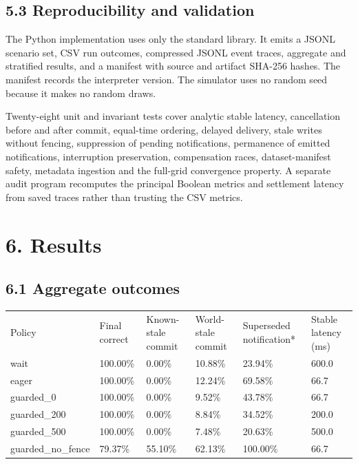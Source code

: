 \documentclass[10pt]{article}
\begin{document}
\subsection*{5.3 Reproducibility and validation}

The Python implementation uses only the standard library. It emits a JSONL scenario set, CSV run outcomes, compressed JSONL event traces, aggregate and stratified results, and a manifest with source and artifact SHA-256 hashes. The manifest records the interpreter version. The simulator uses no random seed because it makes no random draws.


Twenty-eight unit and invariant tests cover analytic stable latency, cancellation before and after commit, equal-time ordering, delayed delivery, stale writes without fencing, suppression of pending notifications, permanence of emitted notifications, interruption preservation, compensation races, dataset-manifest safety, metadata ingestion and the full-grid convergence property. A separate audit program recomputes the principal Boolean metrics and settlement latency from saved traces rather than trusting the CSV metrics.


\section*{6. Results}

\subsection*{6.1 Aggregate outcomes}

{\scriptsize
\begin{tabularx}{\textwidth}{XXXXXX}
\hline
Policy & Final correct & Known-stale commit & World-stale commit & Superseded notification* & Stable latency (ms) \\
wait & 100.00\% & 0.00\% & 10.88\% & 23.94\% & 600.0 \\
eager & 100.00\% & 0.00\% & 12.24\% & 69.58\% & 66.7 \\
guarded\_0 & 100.00\% & 0.00\% & 9.52\% & 43.78\% & 66.7 \\
guarded\_200 & 100.00\% & 0.00\% & 8.84\% & 34.52\% & 200.0 \\
guarded\_500 & 100.00\% & 0.00\% & 7.48\% & 20.63\% & 500.0 \\
guarded\_no\_fence & 79.37\% & 55.10\% & 62.13\% & 100.00\% & 66.7 \\
\hline
\end{tabularx}
}
\end{document}
